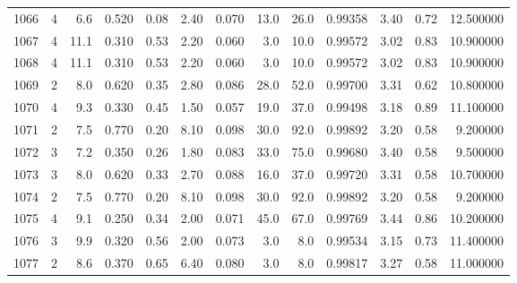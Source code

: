 \begin{tabular}{lrrrrrrrrrrrr}
1066 &        4 &            6.6 &             0.520 &         0.08 &            2.40 &      0.070 &                 13.0 &                  26.0 &  0.99358 &  3.40 &       0.72 &  12.500000 \\
1067 &        4 &           11.1 &             0.310 &         0.53 &            2.20 &      0.060 &                  3.0 &                  10.0 &  0.99572 &  3.02 &       0.83 &  10.900000 \\
1068 &        4 &           11.1 &             0.310 &         0.53 &            2.20 &      0.060 &                  3.0 &                  10.0 &  0.99572 &  3.02 &       0.83 &  10.900000 \\
1069 &        2 &            8.0 &             0.620 &         0.35 &            2.80 &      0.086 &                 28.0 &                  52.0 &  0.99700 &  3.31 &       0.62 &  10.800000 \\
1070 &        4 &            9.3 &             0.330 &         0.45 &            1.50 &      0.057 &                 19.0 &                  37.0 &  0.99498 &  3.18 &       0.89 &  11.100000 \\
1071 &        2 &            7.5 &             0.770 &         0.20 &            8.10 &      0.098 &                 30.0 &                  92.0 &  0.99892 &  3.20 &       0.58 &   9.200000 \\
1072 &        3 &            7.2 &             0.350 &         0.26 &            1.80 &      0.083 &                 33.0 &                  75.0 &  0.99680 &  3.40 &       0.58 &   9.500000 \\
1073 &        3 &            8.0 &             0.620 &         0.33 &            2.70 &      0.088 &                 16.0 &                  37.0 &  0.99720 &  3.31 &       0.58 &  10.700000 \\
1074 &        2 &            7.5 &             0.770 &         0.20 &            8.10 &      0.098 &                 30.0 &                  92.0 &  0.99892 &  3.20 &       0.58 &   9.200000 \\
1075 &        4 &            9.1 &             0.250 &         0.34 &            2.00 &      0.071 &                 45.0 &                  67.0 &  0.99769 &  3.44 &       0.86 &  10.200000 \\
1076 &        3 &            9.9 &             0.320 &         0.56 &            2.00 &      0.073 &                  3.0 &                   8.0 &  0.99534 &  3.15 &       0.73 &  11.400000 \\
1077 &        2 &            8.6 &             0.370 &         0.65 &            6.40 &      0.080 &                  3.0 &                   8.0 &  0.99817 &  3.27 &       0.58 &  11.000000 \\

\end{tabular}
